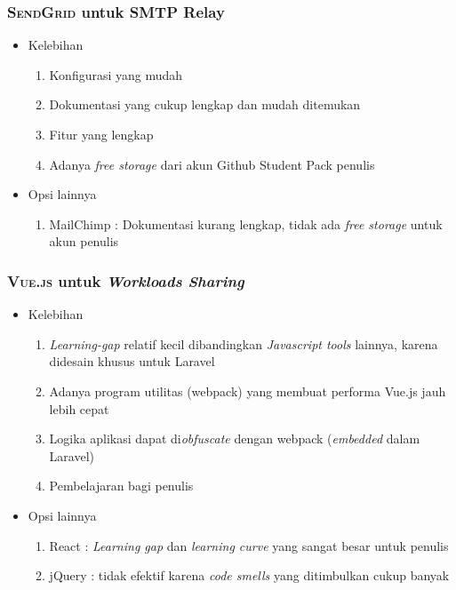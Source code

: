 	\subsubsection{\textsc{SendGrid} untuk SMTP Relay}
	\begin{itemize}
		\item Kelebihan
		\begin{enumerate}
			\item Konfigurasi yang mudah
			\item Dokumentasi yang cukup lengkap dan mudah ditemukan
			\item Fitur yang lengkap
			\item Adanya \textit{free storage} dari akun Github Student Pack penulis
		\end{enumerate}
		\item Opsi lainnya
		\begin{enumerate}
			\item MailChimp : Dokumentasi kurang lengkap, tidak ada \textit{free storage} untuk akun penulis
		\end{enumerate}
	\end{itemize}
	
	\subsubsection{\textsc{Vue.js} untuk \textit{Workloads Sharing}}
		\begin{itemize}
			\item Kelebihan
			\begin{enumerate}
				\item \textit{Learning-gap} relatif kecil dibandingkan \textit{Javascript tools} lainnya, karena didesain khusus untuk Laravel
				\item Adanya program utilitas (webpack) yang membuat performa Vue.js jauh lebih cepat
				\item Logika aplikasi dapat di\textit{obfuscate} dengan webpack (\textit{embedded} dalam Laravel)
				\item Pembelajaran bagi penulis
			\end{enumerate}
			\item Opsi lainnya
			\begin{enumerate}
				\item React : \textit{Learning gap} dan \textit{learning curve} yang sangat besar untuk penulis
				\item jQuery : tidak efektif karena \textit{code smells} yang ditimbulkan cukup banyak
			\end{enumerate}
		\end{itemize}
		
